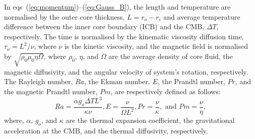 In eqs~(\ref{eq:momentum})--(\ref{eq:Gauss_B}), the length and temperature are normalised by the outer core thickness, $L = r_{o} - r_{i}$ and average temperature difference between the inner core boundary (ICB) and the CMB, $\Delta T$, respectively. 
The time is normalised by the kinematic viscosity diffusion time, $\tau_{\nu}  = L^{2} / \nu$, where $\nu$ is the kinetic viscosity, and the magnetic field is normalised by $\sqrt{\rho_{0} \mu_{0} \eta \Omega}$, where $\rho_{0}$, $\eta$, and $\Omega$ are the average density of core fluid, the magnetic diffusivity, and the angular velocity of system's rotation, respectively.
The Rayleigh number, $Ra$, the Ekman number, $E$, the Prandtl number, $Pr$, and the magnetic Prandtl number, $Pm$, are respectively defined as follows:
%
\begin{equation}
Ra = \displaystyle{ \frac{\alpha g_o \Delta T L^{3}}{ \kappa \nu} }, 
E  = \displaystyle{ \frac{\nu}{\Omega L^{2}} },
Pr = \displaystyle{ \frac{\nu}{\kappa} }, 
\mbox{ and }
Pm = \displaystyle{ \frac{\nu}{\eta} },
\label{eq:dimensionless}
\end{equation}
%
where, $\alpha$, $g_o$, and $\kappa$ are the thermal expansion coefficient, the gravitational acceleration at the CMB, and the thermal diffusivity, respectively.

